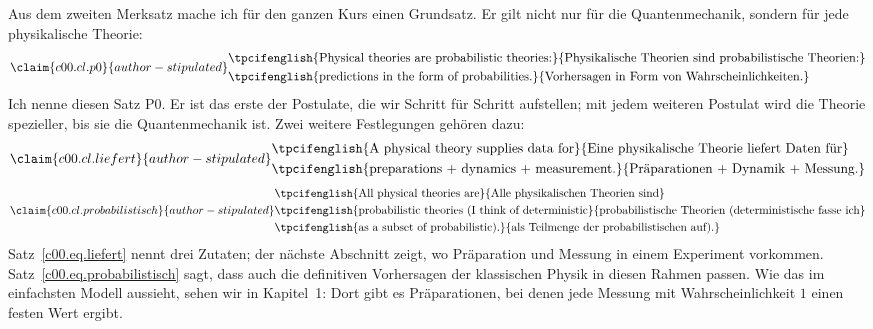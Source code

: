 Aus dem zweiten Merksatz mache ich für den ganzen Kurs einen Grundsatz. Er gilt nicht nur für
die Quantenmechanik, sondern für jede physikalische Theorie:
\begin{equation}\label{c00.eq.p0}\claim{c00.cl.p0}{author-stipulated}
  \begin{aligned}
    &\text{\tpcifenglish{Physical theories are probabilistic theories:}{Physikalische Theorien sind probabilistische Theorien:}} \\
    &\text{\tpcifenglish{predictions in the form of probabilities.}{Vorhersagen in Form von Wahrscheinlichkeiten.}}
  \end{aligned}
\end{equation}
Ich nenne diesen Satz P0. Er ist das erste der Postulate, die wir Schritt für Schritt
aufstellen; mit jedem weiteren Postulat wird die Theorie spezieller, bis sie die
Quantenmechanik ist. Zwei weitere Festlegungen gehören dazu:
\begin{equation}\label{c00.eq.liefert}\claim{c00.cl.liefert}{author-stipulated}
  \begin{aligned}
    &\text{\tpcifenglish{A physical theory supplies data for}{Eine physikalische Theorie liefert Daten für}} \\
    &\text{\tpcifenglish{preparations + dynamics + measurement.}{Präparationen + Dynamik + Messung.}}
  \end{aligned}
\end{equation}
\begin{equation}\label{c00.eq.probabilistisch}\claim{c00.cl.probabilistisch}{author-stipulated}
  \begin{aligned}
    &\text{\tpcifenglish{All physical theories are}{Alle physikalischen Theorien sind}} \\
    &\text{\tpcifenglish{probabilistic theories (I think of deterministic}{probabilistische Theorien (deterministische fasse ich}} \\
    &\text{\tpcifenglish{as a subset of probabilistic).}{als Teilmenge der probabilistischen auf).}}
  \end{aligned}
\end{equation}
Satz~\eqref{c00.eq.liefert} nennt drei Zutaten; der nächste Abschnitt zeigt, wo Präparation
und Messung in einem Experiment vorkommen. Satz~\eqref{c00.eq.probabilistisch} sagt, dass auch die definitiven
Vorhersagen der klassischen Physik in diesen Rahmen passen. Wie das im einfachsten Modell
aussieht, sehen wir in Kapitel~1: Dort gibt es Präparationen, bei denen jede Messung mit
Wahrscheinlichkeit $1$ einen festen Wert ergibt.

